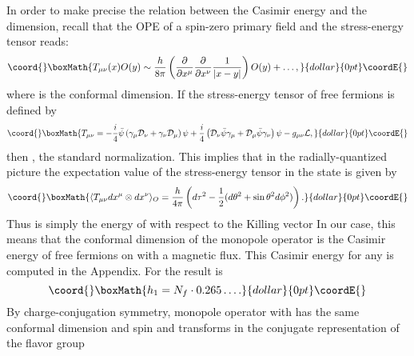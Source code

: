 \documentclass[a4paper,12pt, amsfonts, amssymb]{article}
\providecommand{\bpsi}{{\bar\psi}}
\providecommand{\cD}{{\mathcal D}}
\providecommand{\cL}{{\mathcal L}}
\begin{document}
In order to make precise the relation between the Casimir energy and
the dimension, recall that the OPE of a spin-zero primary field and
the stress-energy tensor reads:
$$\coord{}\boxMath{
T_{\mu\nu}(x) O(y) \sim \frac{h}{8\pi} \left(
\frac{\partial}{\partial x^\mu}\frac{\partial}{\partial x^\nu}
\frac{1}{|x-y|}\right) O(y) + \ldots,
}{dollar}{0pt}\coordE{}$$
where \coordHE{} is the conformal dimension. 
If the stress-energy tensor of free fermions is defined by
$$\coord{}\boxMath{
T_{\mu\nu}=-\frac{i}{4}\bpsi\left(\gamma_\mu\cD_\nu+
\gamma_\nu\cD_\mu\right)\psi+\frac{i}{4}\left(\cD_\nu\bpsi\gamma_\mu+
\cD_\mu \bpsi\gamma_\nu\right)\psi-g_{\mu\nu}\cL,
}{dollar}{0pt}\coordE{}$$
then \myHighlight{$h_\psi=h_{\bpsi}=1$}\coordHE{}, the standard normalization.
This implies that in the radially-quantized picture the expectation
value of the stress-energy tensor in the state \coordHE{}
is given by
$$\coord{}\boxMath{
\langle T_{\mu\nu} dx^\mu\otimes dx^\nu\rangle_O=\frac{h}{4\pi}\left(d\tau^2-
\frac{1}{2}(d\theta^2+\sin\theta^2 d\phi^2)\right).
}{dollar}{0pt}\coordE{}$$
Thus \coordHE{} is simply the energy of \coordHE{} with respect to the
Killing vector \coordHE{} In our case, this means
that the conformal dimension of the monopole operator is the Casimir
energy of \coordHE{} free fermions on \coordHE{} with a magnetic flux.
This Casimir energy for any \coordHE{} is computed in the Appendix. 
For \coordHE{} the result is
$$\coord{}\boxMath{
h_1=N_f \cdot 0.265\ldots.
}{dollar}{0pt}\coordE{}$$ 
By charge-conjugation symmetry, monopole operator with \coordHE{} has the
same conformal dimension and spin and transforms in the conjugate
representation of the flavor group \coordHE{} 
\end{document}
